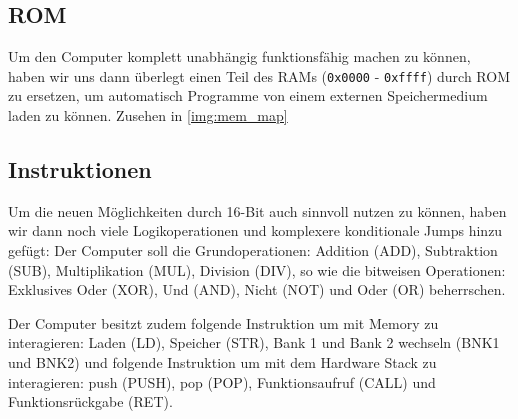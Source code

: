 \documentclass{scrartcl}
\begin{document}
        \vspace{-5pt}

    \subsection{ROM}
    Um den Computer komplett unabhängig funktionsfähig machen zu können, haben wir uns dann überlegt einen Teil des RAMs (\texttt{0x0000} - \texttt{0xffff}) durch ROM zu ersetzen, um automatisch Programme von einem externen Speichermedium laden zu können. Zusehen in \autoref{img:mem_map}

    \subsection{Instruktionen}
    \vspace{-15pt}
    Um die neuen Möglichkeiten durch 16-Bit auch sinnvoll nutzen zu können, haben wir dann noch viele Logikoperationen und komplexere konditionale Jumps hinzu gefügt:
    Der Computer soll die Grundoperationen: Addition (ADD), Subtraktion (SUB), Multiplikation (MUL), Division (DIV),
    so wie die bitweisen Operationen: Exklusives Oder (XOR), Und (AND), Nicht (NOT) und Oder (OR) beherrschen.

    Der Computer besitzt zudem folgende Instruktion um mit Memory zu interagieren: Laden (LD), Speicher (STR), Bank 1 und
    Bank 2 wechseln (BNK1 und BNK2) und folgende Instruktion um mit dem Hardware Stack zu interagieren: push (PUSH), pop
    (POP), Funktionsaufruf (CALL) und Funktionsrückgabe (RET).
\end{document}
